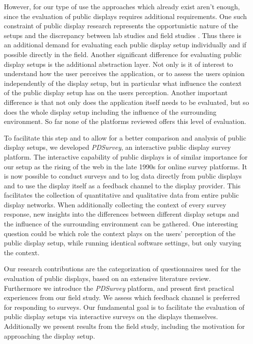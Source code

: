 	However, for our type of use the approaches which already exist aren't enough, since the evaluation of public displays requires additional requirements.
	One such constraint of public display research represents the opportunistic nature of the setups and the discrepancy between lab studies and field studies \cite{Ojala2011}. Thus there is an additional demand for evaluating each public display setup individually and if possible directly in the field. Another significant difference for evaluating public display setups is the additional abstraction layer. Not only is it of interest to understand how the user perceives the application, or to assess the users opinion independently of the display setup, but in particular what influence the context of the public display setup has on the users perception. Another important difference is that not only does the application itself needs to be evaluated, but so does the whole display setup including the influence of the surrounding environment. So far none of the platforms reviewed offers this level of evaluation.


	To facilitate this step and to allow for a better comparison and analysis of public display setups, we developed \textit{PDSurvey}, an interactive public display survey platform. The interactive capability of public displays is of similar importance for our setup as the rising of the web in the late 1990s for online survey platforms. It is now possible to conduct surveys and to log data directly from public displays and to use the display itself as a feedback channel to the display provider.
	This facilitates the collection of quantitative and qualitative data from entire public display networks. When additionally collecting the context of every survey response, new insights into the differences between different display setups and the influence of the surrounding environment can be gathered. One interesting question could be which role the context plays on the users' perception of the public display setup, while running identical software settings, but only varying the context.

	Our research contributions are the categorization of questionnaires used for the evaluation of public displays, based on an extensive literature review. Furthermore we introduce the \textit{PDSurvey} platform, and present first practical experiences from our field study. We assess which feedback channel is preferred for responding to surveys. Our fundamental goal is to facilitate the evaluation of public display setups via interactive surveys on the displays themselves. Additionally we present results from the field study, including the motivation for approaching the display setup.

